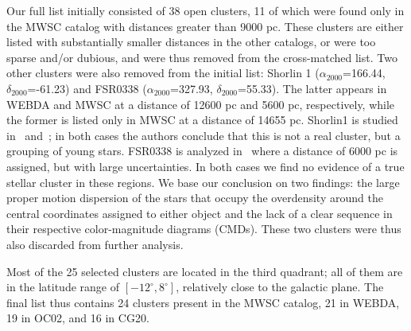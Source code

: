 \documentclass{aa}
\begin{document}
 Our full list initially consisted of 38 open clusters, 11 of
 which were found only in the MWSC catalog with distances greater than 9000 pc.
 These clusters are either listed with substantially smaller distances in the other
 catalogs, or were too sparse and/or dubious, and  were thus removed from
 the cross-matched list.
 Two other clusters were also removed from the initial list: Shorlin 1 
 ($\alpha_{2000}$=166.44, $\delta_{2000}$=-61.23) and FSR0338
 ($\alpha_{2000}$=327.93, $\delta_{2000}$=55.33). The latter appears in WEBDA and
 MWSC at a distance of 12600 pc and 5600 pc, respectively, while the former is
 listed only in MWSC at a distance of 14655 pc. Shorlin1 is studied
 in~\cite{Carraro_2009} and~\cite{Turner_2012}; in both cases the authors
 conclude that this is not a real cluster, but a grouping of young stars.
 FSR0338 is analyzed in~\cite{Froebrich_2010} where a distance of 6000 pc is
 assigned, but with large uncertainties.
 In both cases we find no evidence of a true stellar cluster in these regions.
 We base our conclusion on two findings:  the large proper motion
 dispersion of the stars that occupy the overdensity around the central
 coordinates assigned to either object and the lack of a clear sequence in
 their respective color-magnitude diagrams (CMDs). These two clusters
 were thus also discarded from further analysis.

 Most of the  25 selected clusters are located in the third quadrant;
 all of them are in the latitude range of $\left[-12^{\circ}, 8^{\circ}\right]$,
 relatively close to the galactic plane. The final list thus contains 24
 clusters present in the MWSC catalog, 21 in WEBDA, 19 in OC02, and 16 in
 CG20.\\
\end{document}
